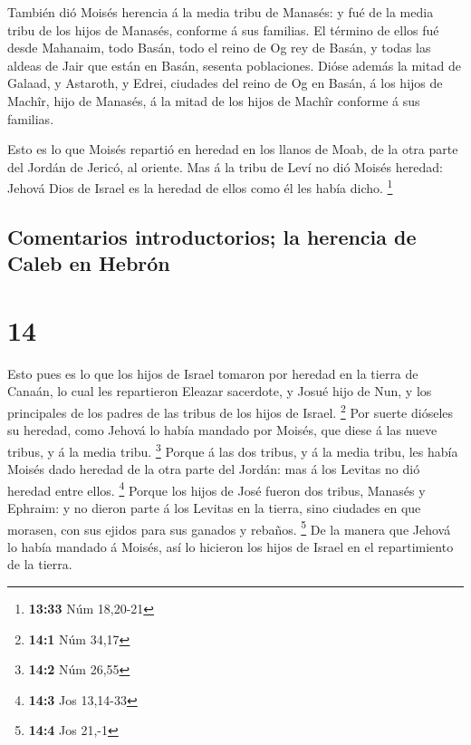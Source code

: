  También dió Moisés herencia á la media tribu de Manasés:
y fué de la media tribu de los hijos de Manasés, conforme á sus
familias.  El término de ellos fué desde Mahanaim, todo
Basán, todo el reino de Og rey de Basán, y todas las aldeas de Jair que
están en Basán, sesenta poblaciones.  Dióse además la
mitad de Galaad, y Astaroth, y Edrei, ciudades del reino de Og en Basán,
á los hijos de Machîr, hijo de Manasés, á la mitad de los hijos de
Machîr conforme á sus familias.

 Esto es lo que Moisés repartió en heredad en los llanos
de Moab, de la otra parte del Jordán de Jericó, al oriente.
 Mas á la tribu de Leví no dió Moisés heredad: Jehová
Dios de Israel es la heredad de ellos como él les había dicho.
\footnote{\textbf{13:33} Núm 18,20-21}

\hypertarget{comentarios-introductorios-la-herencia-de-caleb-en-hebruxf3n}{%
\subsection{Comentarios introductorios; la herencia de Caleb en
Hebrón}\label{comentarios-introductorios-la-herencia-de-caleb-en-hebruxf3n}}

\hypertarget{section-13}{%
\section{14}\label{section-13}}

 Esto pues es lo que los hijos de Israel tomaron por
heredad en la tierra de Canaán, lo cual les repartieron Eleazar
sacerdote, y Josué hijo de Nun, y los principales de los padres de las
tribus de los hijos de Israel. \footnote{\textbf{14:1} Núm 34,17}
 Por suerte dióseles su heredad, como Jehová lo había
mandado por Moisés, que diese á las nueve tribus, y á la media tribu.
\footnote{\textbf{14:2} Núm 26,55}  Porque á las dos
tribus, y á la media tribu, les había Moisés dado heredad de la otra
parte del Jordán: mas á los Levitas no dió heredad entre ellos.
\footnote{\textbf{14:3} Jos 13,14-33}  Porque los hijos de
José fueron dos tribus, Manasés y Ephraim: y no dieron parte á los
Levitas en la tierra, sino ciudades en que morasen, con sus ejidos para
sus ganados y rebaños. \footnote{\textbf{14:4} Jos 21,-1} 
De la manera que Jehová lo había mandado á Moisés, así lo hicieron los
hijos de Israel en el repartimiento de la tierra.

